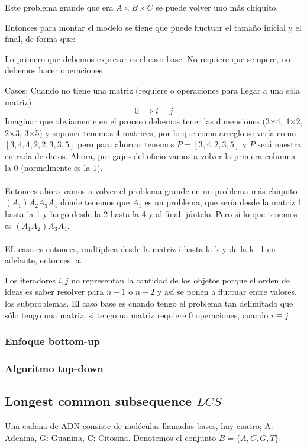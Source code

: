 \documentclass[tikz,11pt,fleqn]{book} %
\begin{document}
\begin{fact}
	Este problema grande que era $A\times B\times C$ se puede volver uno más chiquito.

	Entonces para montar el modelo se tiene que puede fluctuar el tamaño inicial y el final, de forma que:

	Lo primero que debemos expresar es el caso base. No requiere que se opere, no debemos hacer operaciones

	Casos:
	Cuando no tiene una matriz (requiere o operaciones para llegar a una sóla matriz)
	$$
		0\implies i=j
	$$
	Imaginar que obviamente en el proceso debemos tener las dimensiones (3$\times$4, 4$\times$2, 2$\times$3, 3$\times$5) y suponer tenemos 4 matrices, por lo que como arreglo se vería como $[3,4,4,2,2,3,3,5]$ pero para ahorrar tenemos $P=[3,4,2,3,5]$ y $P$ será nuestra entrada de datos. Ahora, por gajes del oficio vamos a volver la primera columna la 0 (normalmente es la 1).
	\\~\\
	Entonces ahora vamos a volver el problema grande en un problema más chiquito $(A_1) A_2 A_3 A_4$ donde tenemos que $A_1$ es un problema, que sería desde la matriz 1 hasta la 1 y luego desde la 2 hasta la 4 y al final, júntelo.
	Pero si lo que tenemos es $(A_1 A_2) A_3 A_4$.
	\\~\\
	EL caso es entonces, multiplica desde la matriz i hasta la k y de la k+1 en adelante, entonces, a.
\end{fact}

Los iteradores $i,j$ no representan la cantidad de los objetos porque el orden de ideas es saber resolver para $n-1$ o $n-2$ y así se ponen a fluctuar entre valores, los subproblemas.
El caso base es cuando tengo el problema tan delimitado que sólo tengo una matriz, si tengo ua matriz requiere 0 operaciones, cuando $i\equiv j$

\subsubsection{Enfoque bottom-up}


\subsubsection{Algoritmo top-down}


\subsection{Longest common subsequence $LCS$}
Una cadena de ADN consiste de moléculas llamadas bases, hay cuatro; A: Adenina, G: Guanina, C: Citosina. Denotemos el conjunto $B=\{A,C,G,T\}$.
\end{document}
